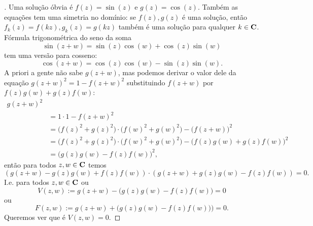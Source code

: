 \pnove*
\begin{proof}[]

Uma solução óbvia é $f(z) = \sin(z)$ e $g(z) =\cos(z)$.
Também as equações tem uma simetria no domínio:
se $f(z),g(z)$ é uma solução, então $f_k(z) = f(kz), g_k(z) = g(kz)$
também é uma solução para qualquer $k\in\mathbf{C}$.
Fórmula trigonométrica do seno da soma
\[ \sin(z+w) = \sin(z) \cos(w) + \cos(z) \sin(w) \]
tem uma versão para cosseno:
\[ \cos(z+w) = \cos(z)\cos(w) - \sin(z)\sin(w). \]
A priori a gente não sabe $g(z+w)$, mas podemos derivar o valor dele
da equação $g(z+w)^2 = 1 - f(z+w)^2$ substituindo $f(z+w)$
por $f(z)g(w)+g(z)f(w)$:
\begin{align*}
g(z+w)^2 
\\ &= 1\cdot 1 - f(z+w)^2
\\ &= \big(f(z)^2+g(z)^2\big)\cdot\big(f(w)^2+g(w)^2\big) - \big(f(z+w)\big)^2
\\ &= \big(f(z)^2+g(z)^2\big)\cdot\big(f(w)^2+g(w)^2\big) - \big(f(z)g(w)+g(z)f(w)\big)^2
\\ &= \big(g(z)g(w)-f(z)f(w)\big)^2,
\end{align*}
então para todos $z,w\in\mathbf{C}$ temos
\[ (g(z+w)-g(z)g(w)+f(z)f(w)) \cdot (g(z+w) + g(z)g(w)-f(z)f(w)) = 0. \]
I.e. para todos $z,w\in\mathbf{C}$ ou
\[ V(z,w) := g(z+w) - \big(g(z)g(w) - f(z)f(w)\big) = 0 \]
ou 
\[ F(z,w) := g(z+w) + \big(g(z)g(w)-f(z)f(w))\big) = 0. \]
Queremos ver que é $V(z,w)=0$.

\end{proof}
